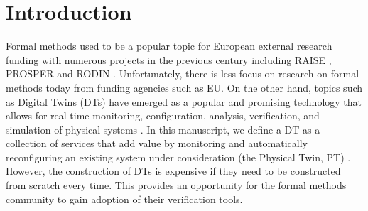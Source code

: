 \section{Introduction}

Formal methods used to be a popular topic for European external research funding with numerous projects in the previous century including RAISE \cite{RAISE92a},  PROSPER \cite{10.1007/3-540-46419-0_7} and RODIN \cite{Abrial&10}. Unfortunately, there is less focus on research on formal methods today from funding agencies such as EU.
On the other hand, topics such as Digital Twins (DTs) have emerged as a popular and promising technology that allows for real-time monitoring, configuration, analysis, verification, and simulation of physical systems \cite{Feng&21c}.
In this manuscript, we define a DT as a collection of services that add value by monitoring and automatically reconfiguring an existing system under consideration (the Physical Twin, PT) \cite{Feng2021}. However, the construction of DTs is expensive if they need to be constructed from scratch every time.
This provides an opportunity for the formal methods community to gain adoption of their verification tools.


